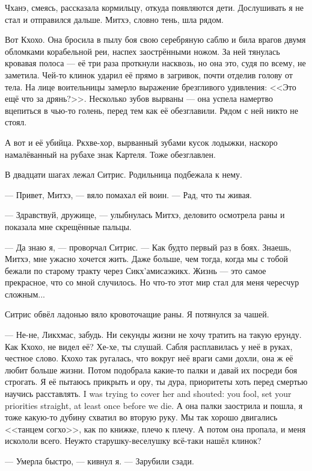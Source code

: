 Чханэ, смеясь, рассказала кормильцу, откуда появляются дети.
Дослушивать я не стал и отправился дальше.
Митхэ, словно тень, шла рядом.

Вот Кхохо.
Она бросила в пылу боя свою серебряную саблю и била врагов двумя обломками корабельной реи, наспех заострёнными ножом.
За ней тянулась кровавая полоса --- её три раза проткнули насквозь, но она это, судя по всему, не заметила.
Чей-то клинок ударил её прямо в загривок, почти отделив голову от тела.
На лице воительницы замерло выражение брезгливого удивления: <<Это ещё что за дрянь?>>.
Несколько зубов вырваны --- она успела намертво вцепиться в чью-то голень, перед тем как её обезглавили.
Рядом с ней никто не стоял.

А вот и её убийца.
Ркхве-хор, вырванный зубами кусок лодыжки, наскоро намалёванный на рубахе знак Картеля.
Тоже обезглавлен.

В двадцати шагах лежал Ситрис.
Родильница подбежала к нему.

--- Привет, Митхэ, --- вяло помахал ей воин.
--- Рад, что ты живая.

--- Здравствуй, дружище, --- улыбнулась Митхэ, деловито осмотрела раны и показала мне скрещённые пальцы.

--- Да знаю я, --- проворчал Ситрис.
--- Как будто первый раз в боях.
Знаешь, Митхэ, мне ужасно хочется жить.
Даже больше, чем тогда, когда мы с тобой бежали по старому тракту через Сикх'амисаэкикх.
Жизнь --- это самое прекрасное, что со мной случилось.
Но что-то этот мир стал для меня чересчур сложным...

Ситрис обвёл ладонью вяло кровоточащие раны.
Я потянулся за чашей.

--- Не-не, Ликхмас, забудь.
Ни секунды жизни не хочу тратить на такую ерунду.
Как Кхохо, не видел её?
Хе-хе, ты слушай.
Сабля расплавилась у неё в руках, честное слово.
Кхохо так ругалась, что вокруг неё враги сами дохли, она ж её любит больше жизни.
Потом подобрала какие-то палки и давай их посреди боя строгать.
{Я её пытаюсь прикрыть и ору, ты дура, приоритеты хоть перед смертью научись расставлять.}
{I was trying to cover her and shouted: you fool, set your priorities straight, at least once before we die.}
А она палки заострила и пошла, я тоже какую-то дубину схватил во вторую руку.
Мы так хорошо двигались <<танцем согхо>>, как по книжке, плечо к плечу.
А потом она пропала, и меня искололи всего.
Неужто старушку-веселушку всё-таки нашёл клинок?

--- Умерла быстро, --- кивнул я.
--- Зарубили сзади.

